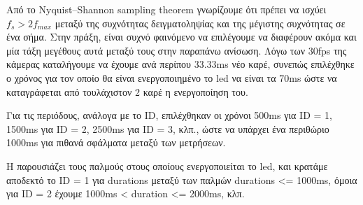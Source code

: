 Από το Nyquist–Shannon sampling theorem γνωρίζουμε ότι πρέπει να ισχύει $f_s > 2f_{max}$ μεταξύ της συχνότητας δειγματοληψίας και της μέγιστης συχνότητας σε ένα σήμα. Στην πράξη, είναι συχνό φαινόμενο να επιλέγουμε να διαφέρουν ακόμα και μία τάξη μεγέθους αυτά μεταξύ τους στην παραπάνω ανίσωση. Λόγω των 30fps της κάμερας καταλήγουμε να έχουμε ανά περίπου 33.33ms νέο καρέ, συνεπώς επιλέχθηκε ο χρόνος για τον οποίο θα είναι ενεργοποιημένο το led να είναι τα 70ms ώστε να καταγράφεται από τουλάχιστον 2 καρέ η ενεργοποίηση του. 

Για τις περιόδους, ανάλογα με το ID, επιλέχθηκαν οι χρόνοι 500ms για ID = 1, 1500ms για ID = 2, 2500ms για ID = 3, κλπ., ώστε να υπάρχει ένα περιθώριο 1000ms για πιθανά σφάλματα μεταξύ των μετρήσεων. 

Η  παρουσιάζει τους παλμούς στους οποίους ενεργοποιείται το led, και κρατάμε αποδεκτό το ID = 1 για durations μεταξύ των παλμών durations <= 1000ms, όμοια για ID = 2 έχουμε 1000ms < duration <= 2000ms, κλπ.


